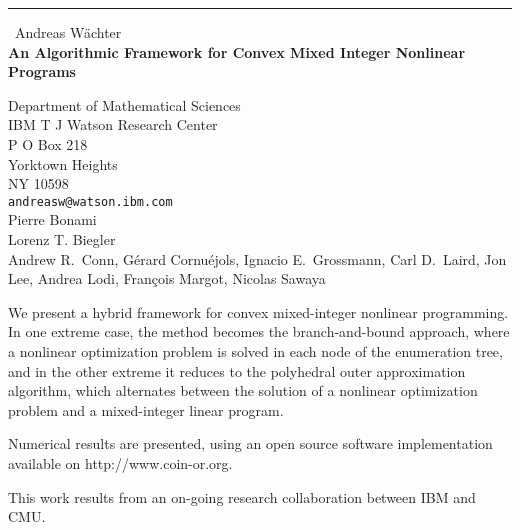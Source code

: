 \documentclass{report}
\begin{document}
\begin{center}
\rule{6in}{1pt} \
{\large Andreas W\"achter \\
{\bf An Algorithmic Framework for Convex Mixed Integer Nonlinear Programs}}

Department of Mathematical Sciences \\ IBM T J Watson Research Center \\ P O Box 218 \\ Yorktown Heights \\ NY 10598
\\
{\tt andreasw@watson.ibm.com}\\
Pierre Bonami\\
Lorenz T. Biegler\\
	Andrew R.\ Conn,
	G\'erard Cornu\'ejols,
	Ignacio E.~Grossmann,
	Carl D.~Laird,
	Jon Lee,
	Andrea Lodi,
	Fran\c{c}ois Margot,
	Nicolas Sawaya\end{center}

We present a hybrid framework for convex mixed-integer nonlinear
programming. In one extreme case, the method becomes the
branch-and-bound approach, where a nonlinear optimization problem is
solved in each node of the enumeration tree, and in the other extreme
it reduces to the polyhedral outer approximation algorithm, which
alternates between the solution of a nonlinear optimization problem
and a mixed-integer linear program.

Numerical results are presented, using an open source software
implementation available on http://www.coin-or.org.

This work results from an on-going research collaboration between IBM
and CMU.
\end{document}
